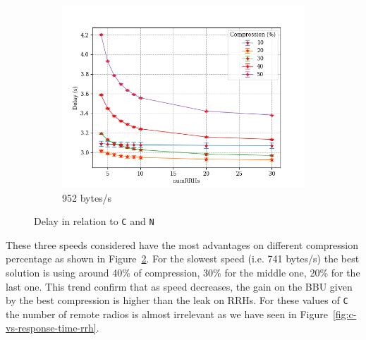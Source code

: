 \documentclass[11pt,a4paper,oneside, openright]{article}
\begin{document}
\begin{figure}[H]
	\begin{subfigure}{.5\textwidth}
		\centering
		\includegraphics[width=\linewidth]{images/n-vs-delay-s-952}
		\caption{952 bytes/s}
		\label{fig:n-vs-delay-s-952}
	\end{subfigure}
	\caption{Delay in relation to \texttt{C} and \texttt{N}}
	\label{fig:n-vs-delay}
\end{figure}
These three speeds considered have the most advantages on different compression percentage as shown in Figure~\ref{fig:n-vs-delay}. 
For the slowest speed (i.e. 741 bytes/s) the best solution is using around 40\% of compression, 30\% for the middle one, 20\% for the last one.
This trend confirm that as speed decreases, the gain on the BBU given by the best compression is higher than the leak on RRHs.
For these values of \texttt{C} the number of remote radios is almost irrelevant as we have seen in Figure~\ref{fig:c-vs-response-time-rrh}.
\end{document}
